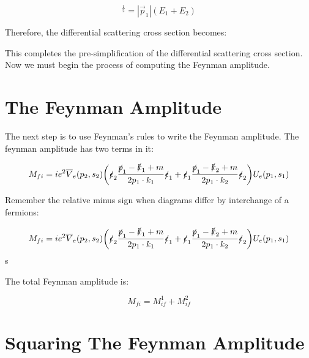 \documentclass[a4]{article}
\begin{document}
    \begin{equation}
        [(p_1 \cdot p_2)^2 - m_1^2 m_2^2]^\frac{1}{2} = |\vec{p}_1| (E_1 + E_2)
    \end{equation}

    Therefore, the differential scattering cross section becomes:

    \begin{center}
    \end{center}

    This completes the pre-simplification of the differential scattering cross section. Now we must begin the process of computing the Feynman amplitude.

    \section*{The Feynman Amplitude}

    The next step is to use Feynman's rules to write the Feynman amplitude. The feynman amplitude has two terms in it:

    \begin{equation}
        M_{fi} = i e^2 \overline{V}_e (p_2, s_2) \bigg( \slashed{\epsilon}_2 \frac{\slashed{p}_1 - \slashed{k}_1 + m}{2 p_1 \cdot k_1} \slashed{\epsilon}_1  + \slashed{\epsilon}_1 \frac{\slashed{p}_1 - \slashed{k}_2 + m}{2 p_1 \cdot k_2} \slashed{\epsilon}_2 \bigg) U_e (p_1, s_1)
    \end{equation}

    Remember the relative minus sign when diagrams differ by interchange of a fermions:

    \begin{equation}
        M_{fi} = i e^2 \overline{V}_e (p_2, s_2) \bigg( \slashed{\epsilon}_2 \frac{\slashed{p}_1 - \slashed{k}_1 + m}{2 p_1 \cdot k_1} \slashed{\epsilon}_1  + \slashed{\epsilon}_1 \frac{\slashed{p}_1 - \slashed{k}_2 + m}{2 p_1 \cdot k_2} \slashed{\epsilon}_2 \bigg) U_e (p_1, s_1)
    \end{equation}s

    The total Feynman amplitude is:

    \begin{equation}
        M_{fi} = M_{if}^1 + M_{if}^2
    \end{equation}

    \section*{Squaring The Feynman Amplitude}
\end{document}
